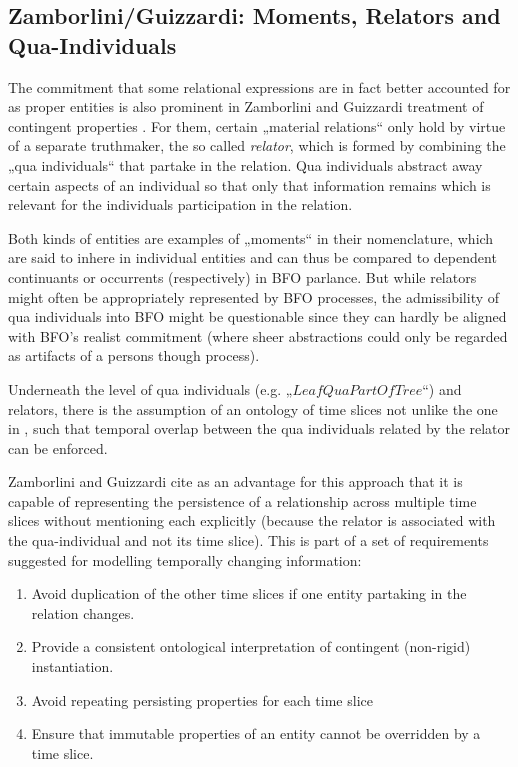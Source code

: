 \documentclass[10pt]{bmc_article}
\newcommand{\mclass}[1]{\ensuremath{\mathit{#1}}}
\newenvironment{bmcformat}{\baselineskip20pt\sloppy\setboolean{publ}{false}}{\baselineskip20pt\sloppy}
\begin{document}
\begin{bmcformat}
\subsection*{Zamborlini/Guizzardi: Moments, Relators and Qua-Individuals}
The commitment that some relational expressions are in fact better accounted for
as proper entities is also prominent in Zamborlini and Guizzardi treatment of 
contingent properties \cite{Zamborlini:Guizzardi}. For them, certain „material
relations“ only hold by virtue of a separate truthmaker, the so called
\emph{relator}, which is formed by combining the „qua individuals“ that
partake in the relation. Qua individuals abstract away certain aspects of an
individual so that only that information remains which is relevant for the
individuals participation in the relation. 

Both kinds of entities are examples of „moments“ in their
nomenclature, which are said to inhere in individual entities and can thus be
compared to dependent continuants or occurrents (respectively) in BFO
parlance. But while relators might often be appropriately represented by BFO
processes, the admissibility of qua individuals into BFO might be questionable
since they can hardly be aligned with BFO's realist commitment (where sheer
abstractions could only be regarded as artifacts of a persons though process). 

Underneath the level of qua individuals (e.g. „$\mclass{LeafQuaPartOfTree}$“)
and relators, there is the assumption of an ontology of time slices not unlike
the one in \cite{Welty:2006}, such that
temporal overlap between the qua individuals related by the relator can be
enforced.

Zamborlini and Guizzardi cite as an advantage for this approach that it is capable
of representing the persistence of a relationship across multiple time slices
without mentioning each explicitly (because the relator is associated with the
qua-individual and not its time slice). This is part of a set of requirements
suggested for modelling temporally changing information:

\begin{enumerate}
\item Avoid duplication of the other time slices if one entity partaking in the
relation changes.
\item Provide a consistent ontological interpretation of contingent (non-rigid)
instantiation.
\item Avoid repeating persisting properties for each time slice
\item Ensure that immutable properties of an entity cannot be overridden by a
time slice.
\end{enumerate}


\end{bmcformat}
\end{document}
